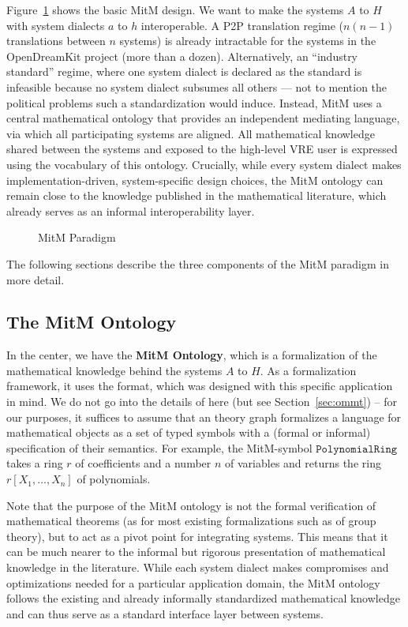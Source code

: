 
Figure~\ref{fig:mitm} shows the basic MitM design.
We want to make the systems $A$ to $H$ with system dialects $a$ to $h$ interoperable.
A P2P translation regime ($n(n-1)$ translations between $n$ systems) is already intractable for the systems in the OpenDreamKit project (more than a dozen).
Alternatively, an ``industry standard'' regime, where one system dialect is declared as the standard is infeasible because no system dialect subsumes all others --- not to mention the political problems such a standardization would induce.
Instead, MitM uses a central mathematical ontology that provides an independent mediating language, via which all participating systems are aligned.
All mathematical knowledge shared between the systems and exposed to the high-level VRE user is expressed using the vocabulary of this ontology.
Crucially, while every system dialect makes implementation-driven, system-specific design choices, the MitM ontology can remain close to the knowledge published in the mathematical literature, which already serves as an informal interoperability layer.

\begin{figure}[ht]\centering
  \caption{MitM Paradigm}\label{fig:mitm}
\end{figure}

The following sections describe the three components of the MitM paradigm in more detail.

\subsection{The MitM Ontology}\label{sec:mitm:recap}

In the center, we have the \textbf{MitM Ontology}, which is a formalization of the mathematical knowledge behind the systems $A$ to $H$.
As a formalization framework, it uses the \OMMT format, which was designed with this specific application in mind.
We do not go into the details of \OMMT here (but see Section~\ref{sec:ommt}) -- for our purposes, it suffices to assume that an \OMMT theory graph formalizes a language for mathematical objects as a set of typed symbols with a (formal or informal) specification of their semantics.
For example, the MitM-symbol $\mathtt{PolynomialRing}$ takes a ring $r$ of coefficients and a number $n$ of variables and returns the ring $r[X_1,\ldots,X_n]$ of polynomials.

Note that the purpose of the MitM ontology is not the formal verification of mathematical theorems (as for most existing formalizations such as \cite{Gonthier+:mcpoot13} of group theory), but to act as a pivot point for integrating systems.
This means that it can be much nearer to the informal but rigorous presentation of mathematical knowledge in the literature.
While each system dialect makes compromises and optimizations needed for a particular application domain, the MitM ontology follows the existing and already informally standardized mathematical knowledge and can thus serve as a standard interface layer between systems.

